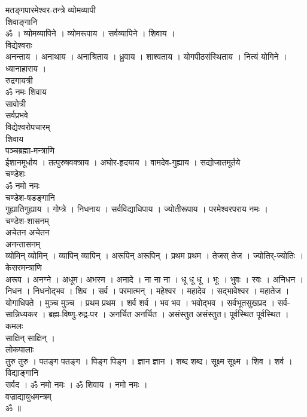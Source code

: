\documentclass[12pt]{article}
\begin{document}
{\large{\sktr
{\color{Brown}मतङ्गपारमेश्वर-तन्त्रे व्योमव्यापी}\\[5pt]
{\color{CadetBlue} शिवाङ्गानि}\\[5pt]
{\color{NavyBlue}ॐ । व्योमव्यापिने । व्योमरूपाय । सर्वव्यापिने । शिवाय ।}\\[5pt]
{\color{CadetBlue} विद्येश्वराः}\\[5pt]
{\color{NavyBlue}अनन्ताय । अनाथाय । अनाश्रिताय । ध्रुवाय । शाश्वताय । योगपीठसंस्थिताय । नित्यं योगिने । ध्यानाहाराय ।}\\[5pt]
{\color{CadetBlue} रुद्रगायत्री}\\[5pt]
{\color{NavyBlue} ॐ नमः शिवाय }\\[5pt]
{\color{CadetBlue} सावोत्री}\\[5pt]
{\color{NavyBlue}  सर्वप्रभवे }\\[5pt]
{\color{CadetBlue} विद्येश्वरोपचारम् } \\[5pt]
{\color{NavyBlue}  शिवाय}\\[5pt]
{\color{CadetBlue} पञ्चब्रह्मा-मन्त्राणि } \\[5pt]
{\color{NavyBlue} ईशानमूर्धाय । तत्पुरुषवक्त्राय । अघोर-हृदयाय ।  वामदेव-गुह्याय  । सद्योजातमूर्तये }\\[5pt]
{\color{CadetBlue} चण्डेशः } \\[5pt]	
{\color{NavyBlue} ॐ नमो नमः }\\[5pt]
{\color{CadetBlue} चण्डेश-षडङ्गानि } \\[5pt]
{\color{NavyBlue}  गुह्यातिगुह्याय ।  गोप्त्रे  ।  निधनाय । सर्वविद्याधिपाय  ।  ज्योतीरूपाय  । परमेश्वरपराय नमः । }\\[5pt]	
{\color{CadetBlue} चण्डेश-शासनम् } \\[5pt]
{\color{NavyBlue} अचेतन अचेतन}\\[5pt]
{\color{CadetBlue} अनन्तासनम् } \\[5pt]
{\color{NavyBlue}  व्योमिन् व्योमिन् ।  व्यापिन् व्यापिन् । अरूपिन् अरूपिन् । प्रथम प्रथम ।  तेजस् तेज । ज्योतिर्-ज्योतिः । \\[5pt] }
{\color{CadetBlue} केसरमन्त्राणि } \\[5pt]
{\color{NavyBlue}  अरूप । अनग्ने । अधूम। अभस्म । अनादे । ना ना ना ।  धू धू धू ।  भूः । भुवः । स्वः । अनिधन । निधन । निधनोद्भव । शिव ।  सर्व । परमात्मन् । महेश्वर । महादेव । सद्भावेश्वर । महातेज । योगाधिपते ।  मुञ्च मुञ्च । प्रथम प्रथम । शर्व शर्व । भव भव । भवोद्भव । सर्वभूतसुखप्रद ।  सर्व-सान्निध्यकर । ब्रह्म-विष्णु-रुद्र-पर । अनर्चित अनर्चित । असंस्तुत असंस्तुत। पूर्वस्थित पूर्वस्थित । }\\[5pt]
{\color{CadetBlue} कमलः } \\[5pt]	
{\color{NavyBlue} साक्षिन् साक्षिन् ।}\\[5pt]	
{\color{CadetBlue} लोकपालाः } \\[5pt]	
{\color{NavyBlue} तुरु तुरु । पतङ्ग पतङ्ग । पिङ्ग पिङ्ग । ज्ञान ज्ञान । शब्द शब्द। सूक्ष्म सूक्ष्म । शिव । शर्व ।  }\\[5pt]
{\color{CadetBlue} विद्याङ्गानि } \\[5pt]	
{\color{NavyBlue} सर्वद । ॐ नमो नमः । ॐ शिवाय । नमो नमः । }\\[5pt]
{\color{CadetBlue} वज्राद्यायुधमन्त्रम्} \\[5pt]	
{\color{NavyBlue} ॐ ॥}
}}
\end{document}
